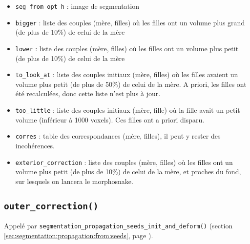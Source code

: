 \documentclass{article}
\def \mycolor {red}
\begin{document}
\begin{itemize}
\itemsep -0.5ex
\item \verb|seg_from_opt_h| : image de segmentation
\item \verb|bigger| : liste des couples (m\`ere, filles) o\`u les filles ont un volume plus grand (de plus de 10\%) de celui de la m\`ere
\item \verb|lower| : liste des couples (m\`ere, filles) o\`u les filles ont un volume plus petit (de plus de 10\%) de celui de la m\`ere
\item \verb|to_look_at| : liste des couples initiaux (m\`ere, filles) o\`u les filles avaient un volume plus petit (de plus de 50\%) de celui de la m\`ere. A priori, les filles ont \'et\'e recalcul\'ees, donc cette liste n'est plus \`a jour.
\item \verb|too_little| : liste des couples initiaux (m\`ere, fille) o\`u la fille avait un petit volume (inf\'erieur \`a 1000 voxels). Ces filles ont a priori disparu.
\item \verb|corres| : table des correspondances (m\`ere, filles), il peut y rester des incoh\'erences.
\item \verb|exterior_correction| : liste des couples (m\`ere, filles) o\`u les filles ont un volume plus petit (de plus de 10\%) de celui de la m\`ere, et proches du fond, sur lesquels on lancera le morphosnake.
\end{itemize}
\color{black}




\subsection{\texttt{outer\_correction()}}
\label{sec:outer:correction}

\color{\mycolor}
Appel\'e par \texttt{segmentation\_propagation\_seeds\_init\_and\_deform()} (section \ref{sec:segmentation:propagation:from:seeds}, page \pageref{sec:segmentation:propagation:from:seeds}).
\color{black}
\end{document}
